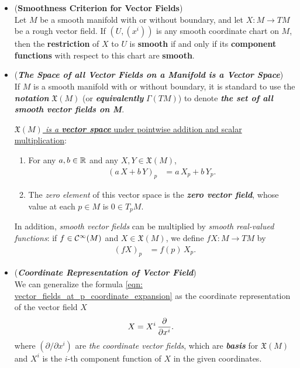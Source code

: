 \documentclass[11pt]{article}
\begin{document}
\begin{itemize}
\item 
\begin{proposition}\label{prop: vector_field_smooth_condition} (\textbf{Smoothness Criterion for Vector Fields}) \citep{lee2003introduction} \\
Let $M$ be a smooth manifold with or without boundary, and let $X: M \rightarrow TM$ be a rough vector field. If $(U, (x^i))$ is any smooth coordinate chart on $M$, then the \textbf{restriction} of $X$ to $U$ is \textbf{smooth} if and only if its \textbf{component functions} with respect to this chart are \textbf{smooth}.
\end{proposition}

\item \begin{remark} (\emph{\textbf{The Space of all Vector Fields on a Manifold is a Vector Space}})\\
If $M$ is a smooth manifold with or without boundary, it is standard to use the \emph{\textbf{notation}} $\mathfrak{X}(M)$ (or \emph{\textbf{equivalently}} $\Gamma(TM)$) to denote \emph{\textbf{the set of all smooth vector fields on M}}. 

\underline{\emph{$\mathfrak{X}(M)$ is a \textbf{vector space}} under pointwise addition and scalar multiplication}:
\begin{enumerate}
\item For any $a, b \in {\mathbb R}$ and any $X, Y \in \mathfrak{X}(M)$,
\begin{align*}
(a\,X + b\,Y)_{p} &= a\,X_{p} + b\,Y_{p}.
\end{align*}
\item The \emph{zero element} of this vector space is the \emph{\textbf{zero vector field}}, whose value at each $p \in M$ is $0 \in T_{p}M$.
\end{enumerate}

In addition, \emph{smooth vector fields} can be multiplied by \emph{smooth real-valued functions}: if $f \in {\mathcal C}^{\infty}(M)$ and $X \in \mathfrak{X}(M)$, we define $fX: M \rightarrow TM$ by
\begin{align*}
(fX)_p &= f(p)\, X_p.
\end{align*}
\end{remark}

\item \begin{remark} (\emph{\textbf{Coordinate Representation of Vector Field}})\\
We can generalize the formula \eqref{eqn: vector_fields_at_p_coordinate_expansion} as the coordinate representation of the vector field $X$
\begin{align}
X &= X^{i}\,\frac{\partial }{ \partial x^{i}}.  \label{eqn: vector_fields_coordinate_expansion}
\end{align}  where $(\partial / \partial x^{i})$ are \emph{the coordinate vector fields}, which are \emph{\textbf{basis}} for $\mathfrak{X}(M)$ and $X^i$ is the $i$-th component function of $X$ in the given coordinates.


\end{remark}
\end{itemize}
\end{document}
